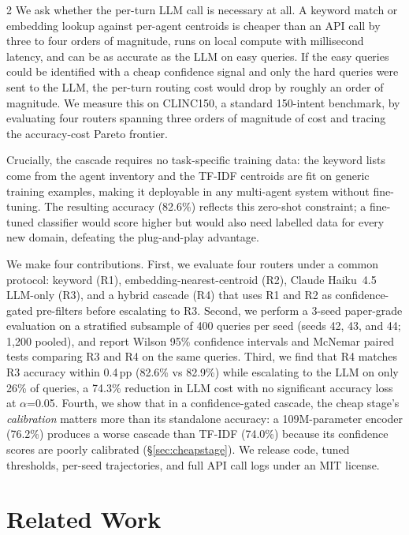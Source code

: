 \documentclass[11pt,a4paper]{article}
\begin{document}
\begin{multicols}{2}
We ask whether the per-turn LLM call is necessary at all. A keyword match or embedding lookup against per-agent centroids is cheaper than an API call by three to four orders of magnitude, runs on local compute with millisecond latency, and can be as accurate as the LLM on easy queries. If the easy queries could be identified with a cheap confidence signal and only the hard queries were sent to the LLM, the per-turn routing cost would drop by roughly an order of magnitude. We measure this on CLINC150, a standard 150-intent benchmark, by evaluating four routers spanning three orders of magnitude of cost and tracing the accuracy-cost Pareto frontier.

Crucially, the cascade requires no task-specific training data: the keyword lists come from the agent inventory and the TF-IDF centroids are fit on generic training examples, making it deployable in any multi-agent system without fine-tuning. The resulting accuracy (82.6\%) reflects this zero-shot constraint; a fine-tuned classifier would score higher but would also need labelled data for every new domain, defeating the plug-and-play advantage.

We make four contributions. First, we evaluate four routers under a common protocol: keyword (R1), embedding-nearest-centroid (R2), Claude Haiku~4.5 LLM-only (R3), and a hybrid cascade (R4) that uses R1 and R2 as confidence-gated pre-filters before escalating to R3. Second, we perform a 3-seed paper-grade evaluation on a stratified subsample of 400 queries per seed (seeds 42, 43, and 44; 1,200 pooled), and report Wilson 95\% confidence intervals and McNemar paired tests comparing R3 and R4 on the same queries. Third, we find that R4 matches R3 accuracy within 0.4\,pp (82.6\% vs 82.9\%) while escalating to the LLM on only 26\% of queries, a 74.3\% reduction in LLM cost with no significant accuracy loss at $\alpha$=0.05. Fourth, we show that in a confidence-gated cascade, the cheap stage's \emph{calibration} matters more than its standalone accuracy: a 109M-parameter encoder (76.2\%) produces a worse cascade than TF-IDF (74.0\%) because its confidence scores are poorly calibrated (\S\ref{sec:cheapstage}). We release code, tuned thresholds, per-seed trajectories, and full API call logs under an MIT license.

\section{Related Work}


\end{multicols}
\end{document}
